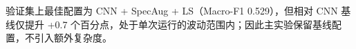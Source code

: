 验证集上最佳配置为 CNN + SpecAug + LS（Macro-F1 0.529），但相对 CNN 基线仅提升 +0.7 个百分点，处于单次运行的波动范围内；因此主实验保留基线配置，不引入额外复杂度。